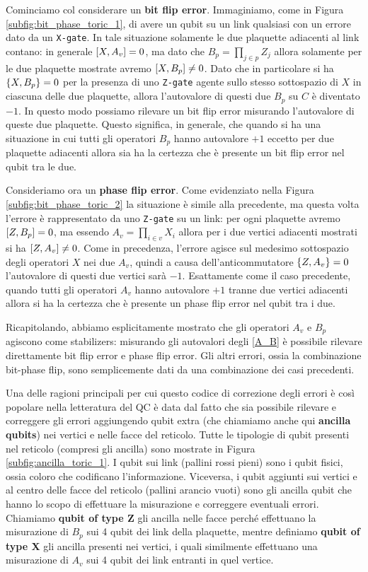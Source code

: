 \noindent Cominciamo col considerare un \textbf{bit flip error}. Immaginiamo, come in Figura \ref{subfig:bit_phase_toric_1}, di avere un qubit su un link qualsiasi con un errore dato da un \texttt{X-gate}.  In tale situazione solamente le due plaquette adiacenti al link contano: in generale $\comm{X}{A_v} = 0$, ma dato che $B_p = \prod_{j \in p} Z_j$ allora solamente per le due plaquette mostrate avremo $\comm{X}{B_p} \neq 0$. Dato che in particolare si ha $\acomm{X}{B_p} = 0$ per la presenza di uno \texttt{Z-gate} agente sullo stesso sottospazio di $X$ in ciascuna delle due plaquette, allora l'autovalore di questi due $B_p$ su $C$ è diventato $-1$. In questo modo possiamo rilevare un bit flip error misurando l'autovalore di queste due plaquette. Questo significa, in generale, che quando si ha una situazione in cui tutti gli operatori $B_p$ hanno autovalore $+1$ eccetto per due plaquette adiacenti allora sia ha la certezza che è presente un bit flip error nel qubit tra le due. 

\noindent Consideriamo ora un \textbf{phase flip error}. Come evidenziato nella Figura \ref{subfig:bit_phase_toric_2} la situazione è simile alla precedente, ma questa volta l'errore è rappresentato da uno \texttt{Z-gate} su un link: per ogni plaquette avremo $\comm{Z}{B_p} = 0$, ma essendo $A_v = \prod_{i \in v} X_i$ allora per i due vertici adiacenti mostrati si ha $\comm{Z}{A_v} \neq 0$. Come in precedenza, l'errore agisce sul medesimo sottospazio degli operatori $X$ nei due $A_v$, quindi a causa dell'anticommutatore $\acomm{Z}{A_v} = 0$ l'autovalore di questi due vertici sarà $-1$. Esattamente come il caso precedente, quando tutti gli operatori $A_v$ hanno autovalore $+1$ tranne due vertici adiacenti allora si ha la certezza che è presente un phase flip error nel qubit tra i due. 

\noindent Ricapitolando, abbiamo esplicitamente mostrato che gli operatori $A_v$ e $B_p$ agiscono come stabilizers: misurando gli autovalori degli \eqref{A_B} è possibile rilevare direttamente bit flip error e phase flip error. Gli altri errori, ossia la combinazione bit-phase flip, sono semplicemente dati da una combinazione dei casi precedenti. 

\noindent Una delle ragioni principali per cui questo codice di correzione degli errori è così popolare nella letteratura del QC è data dal fatto che sia possibile rilevare e correggere gli errori aggiungendo qubit extra (che chiamiamo anche qui \textbf{ancilla qubits}) nei vertici e nelle facce del reticolo. Tutte le tipologie di qubit presenti nel reticolo (compresi gli ancilla) sono mostrate in Figura \ref{subfig:ancilla_toric_1}. I qubit sui link (pallini rossi pieni) sono i qubit fisici, ossia coloro che codificano l'informazione. Viceversa, i qubit aggiunti sui vertici e al centro delle facce del reticolo (pallini arancio vuoti) sono gli ancilla qubit che hanno lo scopo di effettuare la misurazione e correggere eventuali errori. Chiamiamo \textbf{qubit of type Z} gli ancilla nelle facce perché effettuano la misurazione di $B_p$ sui 4 qubit dei link della plaquette, mentre definiamo \textbf{qubit of type X} gli ancilla presenti nei vertici, i quali similmente effettuano una misurazione di $A_v$ sui 4 qubit dei link entranti in quel vertice.

